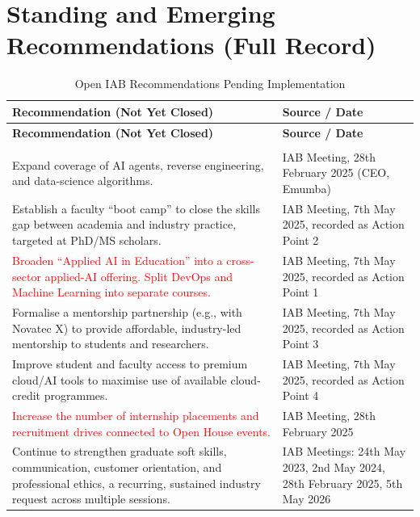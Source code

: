 \section{Standing and Emerging Recommendations (Full Record)}

\begingroup
\footnotesize
\setlength{\tabcolsep}{4pt}
\renewcommand{\arraystretch}{1.2}
\begin{longtable}[]{@{}>{\raggedright\arraybackslash}p{}>{\raggedright\arraybackslash}p{}@{}}
\caption{Open IAB Recommendations Pending Implementation}\label{tab:iab_open}\\
\toprule
\textbf{Recommendation (Not Yet Closed)} & \textbf{Source / Date}\\
\midrule
\endfirsthead
\toprule
\textbf{Recommendation (Not Yet Closed)} & \textbf{Source / Date}\\
\midrule
\endhead
\midrule
\multicolumn{2}{r}{\footnotesize\itshape Continued on next page}\\
\endfoot
\bottomrule
\endlastfoot
Expand coverage of AI agents, reverse engineering, and data-science algorithms. & IAB Meeting, 28th February 2025 (CEO, Emumba)\\
Establish a faculty ``boot camp'' to close the skills gap between academia and industry practice, targeted at PhD/MS scholars. & IAB Meeting, 7th May 2025, recorded as Action Point 2\\
\textcolor{red}{Broaden ``Applied AI in Education'' into a cross-sector applied-AI offering. Split DevOps and Machine Learning into separate courses.} & IAB Meeting, 7th May 2025, recorded as Action Point 1\\
Formalise a mentorship partnership (e.g., with Novatec X) to provide affordable, industry-led mentorship to students and researchers. & IAB Meeting, 7th May 2025, recorded as Action Point 3\\
Improve student and faculty access to premium cloud/AI tools to maximise use of available cloud-credit programmes. & IAB Meeting, 7th May 2025, recorded as Action Point 4\\
\textcolor{red}{Increase the number of internship placements and recruitment drives connected to Open House events.} & IAB Meeting, 28th February 2025\\
Continue to strengthen graduate soft skills, communication, customer orientation, and professional ethics, a recurring, sustained industry request across multiple sessions. & IAB Meetings: 24th May 2023, 2nd May 2024, 28th February 2025, 5th May 2026\\
\end{longtable}
\endgroup
